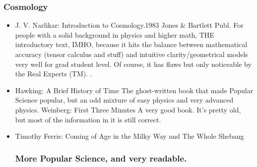 \documentclass[10pt,a4paper]{book}
\theoremstyle{definition}
\begin{document}
\subsubsection{Cosmology}
\begin{itemize}
\item J. V. Narlikar: Introduction to Cosmology.1983 Jones \& Bartlett Publ.
For people with a solid background in physics and higher math, THE introductory text, IMHO, because it hits the balance between mathematical accuracy (tensor calculus and stuff) and intuitive clarity/geometrical models very well for grad student level.  Of course, it has flaws but only noticeable by the Real Experts (TM). .
\item Hawking: A Brief History of Time
The ghost-written book that made Popular Science popular, but an odd mixture of easy physics and very advanced physics.
Weinberg: First Three Minutes
A very good book.  It's pretty old, but most of the information in it is still correct.
\item Timothy Ferris: Coming of Age in the Milky Way and The Whole Shebang

\subsubsection{More Popular Science, and very readable.}


\end{itemize}
\end{document}
